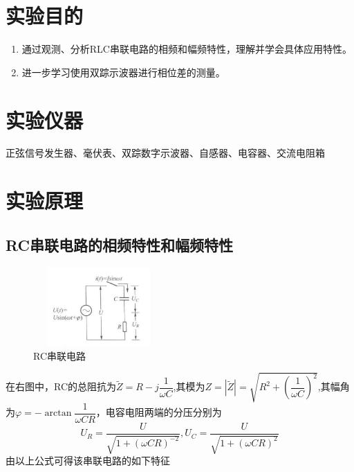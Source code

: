 \fancypage{\fbox}{}
\section{实验目的}
\begin{enumerate}
    \item 通过观测、分析RLC串联电路的相频和幅频特性，理解并学会具体应用特性。
    \item 进一步学习使用双踪示波器进行相位差的测量。
\end{enumerate}
\section{实验仪器}


正弦信号发生器、毫伏表、双踪数字示波器、自感器、电容器、交流电阻箱

\section{实验原理}
\subsection{RC串联电路的相频特性和幅频特性}
\begin{figure} %
	\centering
	\includegraphics[height=3cm,width=5cm]{figure/1.png}
    \caption*{RC串联电路}
\end{figure}
在右图中，RC的总阻抗为$\tilde{Z}=R-j\dfrac{1}{\omega C}$,其模为$Z=|\tilde{Z}|=\sqrt{R^2+\left(\dfrac{1}{\omega C}\right)^2}$,其幅角为$\varphi=-\arctan \dfrac{1}{\omega CR}$，电容电阻两端的分压分别为
$$
U_R=\dfrac{U}{\sqrt{1+(\omega CR)^{-2}}},U_C=\dfrac{U}{\sqrt{1+(\omega CR)^{2}}}
$$
由以上公式可得该串联电路的如下特征
